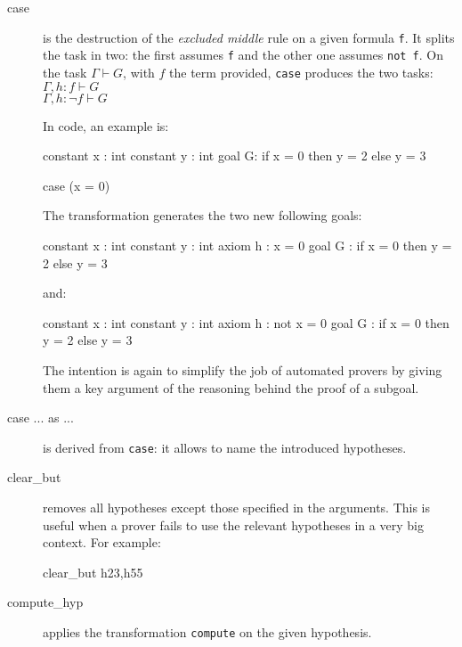 \begin{description}
\item[case] is the destruction of the \textit{excluded middle} rule on a given
  formula \texttt{f}. It splits the task in two: the first assumes \texttt{f}
  and the other one assumes \texttt{not f}.
  On the task $\Gamma \vdash G$, with $f$ the term provided, \texttt{case}
  produces the two tasks:\\
$\Gamma, h : f \vdash G$\\
$\Gamma, h : \neg f \vdash G$

In \why code, an example is:
\begin{whycode}
constant x : int
constant y : int
goal G: if x = 0 then y = 2 else y = 3
\end{whycode}

\begin{transwhy3}
case (x = 0)
\end{transwhy3}

The transformation generates the two new following goals:

\begin{whycode}
constant x : int
constant y : int
axiom h : x = 0
goal G : if x = 0 then y = 2 else y = 3
\end{whycode}
and:
\begin{whycode}
constant x : int
constant y : int
axiom h : not x = 0
goal G : if x = 0 then y = 2 else y = 3
\end{whycode}

The intention is again to simplify the job of automated provers by giving them a
key argument of the reasoning behind the proof of a subgoal.


\item[case ... as ...] is derived from \texttt{case}: it allows to name the
  introduced hypotheses.

\item[clear\_but] removes all hypotheses except those specified in
  the arguments. This is useful when a prover fails to use the relevant
  hypotheses in a very big context.
  For example:
\begin{transwhy3}
clear_but h23,h55
\end{transwhy3}


\item[compute\_hyp] applies the transformation \texttt{compute} on the given
  hypothesis.



\end{description}
